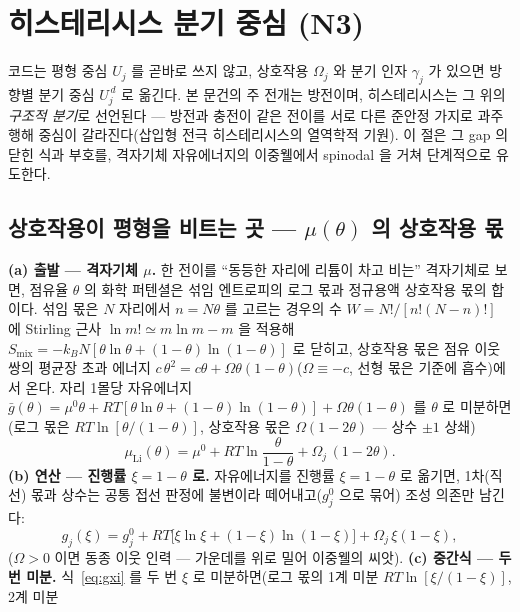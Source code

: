 \documentclass[11pt,a4paper]{article}
\begin{document}
\section{히스테리시스 분기 중심 (N3)}\label{sec:hys}
코드는 평형 중심 $U_j$ 를 곧바로 쓰지 않고, 상호작용 $\Omega_j$ 와 분기 인자 $\gamma_j$ 가 있으면 방향별 분기 중심
$U_j^{\,d}$ 로 옮긴다. 본 문건의 주 전개는 방전이며, 히스테리시스는 그 위의 \emph{구조적 분기}로 선언된다 — 방전과 충전이
같은 전이를 서로 다른 준안정 가지로 과주행해 중심이 갈라진다(삽입형 전극 히스테리시스의 열역학적 기원\cite{dreyer2010}).
이 절은 그 gap 의 닫힌 식과 부호를, 격자기체 자유에너지의
이중웰에서 spinodal 을 거쳐 단계적으로 유도한다.

\subsection{상호작용이 평형을 비트는 곳 — $\mu(\theta)$ 의 상호작용 몫}
\textbf{(a) 출발 — 격자기체 $\mu$.} 한 전이를 ``동등한 자리에 리튬이 차고 비는'' 격자기체로 보면, 점유율 $\theta$ 의 화학
퍼텐셜은 섞임 엔트로피의 로그 몫과 정규용액 상호작용 몫의 합이다. 섞임 몫은 $N$ 자리에서 $n=N\theta$ 를 고르는 경우의
수 $W=N!/[n!(N-n)!]$ 에 Stirling 근사 $\ln m!\simeq m\ln m-m$ 을 적용해
$S_\mathrm{mix}=-k_BN[\theta\ln\theta+(1-\theta)\ln(1-\theta)]$ 로 닫히고, 상호작용 몫은 점유 이웃 쌍의 평균장 초과
에너지 $c\,\theta^2=c\theta+\Omega\theta(1-\theta)$($\Omega\equiv-c$, 선형 몫은 기준에 흡수)에서 온다. 자리 1몰당
자유에너지 $\bar g(\theta)=\mu^0\theta+RT[\theta\ln\theta+(1-\theta)\ln(1-\theta)]+\Omega\theta(1-\theta)$ 를
$\theta$ 로 미분하면(로그 몫은 $RT\ln[\theta/(1-\theta)]$, 상호작용 몫은 $\Omega(1-2\theta)$ — 상수 $\pm1$ 상쇄)
\begin{equation}
\mu_\mathrm{Li}(\theta)=\mu^0+RT\ln\frac{\theta}{1-\theta}+\Omega_j\,(1-2\theta).
\label{eq:mu}
\end{equation}
\textbf{(b) 연산 — 진행률 $\xi=1-\theta$ 로.} 자유에너지를 진행률 $\xi=1-\theta$ 로 옮기면, 1차(직선) 몫과 상수는
공통 접선 판정에 불변이라 떼어내고($g_j^0$ 으로 묶어) 조성 의존만 남긴다:
\begin{equation}
g_j(\xi)=g_j^0+RT\big[\xi\ln\xi+(1-\xi)\ln(1-\xi)\big]+\Omega_j\,\xi(1-\xi),
\label{eq:gxi}
\end{equation}
($\Omega>0$ 이면 동종 이웃 인력 — 가운데를 위로 밀어 이중웰의 씨앗). \textbf{(c) 중간식 — 두 번 미분.}
식~\eqref{eq:gxi} 를 두 번 $\xi$ 로 미분하면(로그 몫의 1계 미분 $RT\ln[\xi/(1-\xi)]$, 2계 미분
\end{document}
